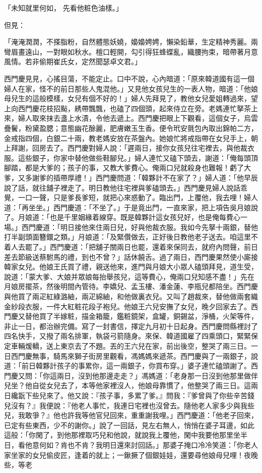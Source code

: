 \begin{showcontents}{}
「未知就里何如，  先看他粧色油樣。」

但見：

「淹淹潤潤，不搽脂粉，自然體態妖嬈，嬝嬝娉娉，懶染鉛華，生定精神秀麗。兩彎眉畫遠山，一對眼如秋水。檀口輕開，勾引得狂蜂蝶亂，織腰拘束，暗帶著月意風情。若非偷期崔氏女，定然聞瑟卓文君。」

西門慶見見，心搖目蕩，不能定止。口中不說，心內暗道：「原來韓道國有這一個婦人在家，怪不的前日那些人鬼混他。」又見他女孩兒生的一表人物，暗道：「他娘母兒生的這般模樣，女兒有個不好的！」婦人先拜見了，教他女兒愛姐轉過來，望上向西門慶花枝招颭，綉帶飄飄，也磕了四個頭，起來侍立在旁。老媽連忙拏茶上來，婦人取來抹去盞上水漬，令他去遞上。西門慶把眼上下觀看，這個女子，烏雲疊鬢，粉黛盈腮；意態幽花酴麗，肥膚嫩玉生香。便令玳安氈包內取出錦帕二方，金戒指四個，白銀二十兩，教老媽安放在茶盤內。她娘忙將戒指帶在女兒手上，朝上拜謝，回房去了。西門慶對婦人說：「遲兩日，接你女孩兒往宅裡去，與他裁衣服。這些銀子，你家中替他做些鞋腳兒。」婦人連忙又磕下頭去，謝道：「俺每頭頂腳踏，都是大爹的；孩子的事，又教大爹費心。俺兩口兒就殺身也難報！虧了大爹，又多謝爹的插帶厚禮！」西門慶問道：「韓夥計不在家了？」婦人道：「他早辰說了話，就往舖子裡走了。明日教他往宅裡與爹磕頭去。」西門慶見婦人說話乖覺，一口一聲，只是爹長爹短，就把心來惑動了。臨出門，上覆他，我去哩！婦人道：「再坐坐。」西門慶道：「不坐了。」于是竟出門，一直來家，把上項告吳月娘說了。月娘道：「也是千里姻緣着線穿。既是韓夥計這女孩兒好，也是俺每費心一場。」西門慶道：「明日接他來住兩日兒，好與他裁衣服。我如今先拏十兩銀，替他打半副頭面簪鐶之類。」月娘道：「及緊儹做去，正好後日教他老子送去。咱這里不着人去罷了。」西門慶道：「把舖子關兩日也罷，還着來保同去，就府內問聲，前日差去節級送蔡駙馬的禮，到也不曾？」話休饒舌。過了兩日，西門慶果然使小廝接韓家女兒。他娘王氏買了禮，親送他來，進門與月娘大小眾人磕頭拜見，道生受，說道：「蒙大爹、大娘并眾娘每抬舉孩兒，這等費心，俺兩口兒知感不盡！」先在月娘房擺茶，然後明間內管待。李嬌兒、孟玉樓、潘金蓮、李瓶兒都陪坐。西門慶與他買了兩疋紅綠潞紬，兩疋綿紬，和他做裏衣兒。又叫了趙裁來，替他做兩套織金紗段衣服，一件大紅粧花段子袍兒。他娘王六兒安撫了女兒，晚夕回家去了。西門慶又替他買了半嫁粧，描金箱籠，鑑粧鏡架，盒罐，銅錫盆，淨桶，火架等件，非止一日，都治辦完備。寫了一封書信，擇定九月初十日起身。西門慶問縣裡討了四名快手，又撥了兩名排軍，執袋弓箭隨身。來保、韓道國雇了四乘頭口，緊緊保定車輛煖轎，送上東京去了不題。丟的王六兒在家，前出後空，整哭了兩三日。一日西門慶無事，騎馬來獅子街房里觀看，馮媽媽來遞茶。西門慶與了一兩銀子，說道：「前日韓夥計孩子的事累你，這一兩銀子，你買布穿。」婆子連忙磕頭謝了。西門慶又問：「你這兩日，沒到他那邊走走？」馮媽道：「老身那一日沒到他那里做伴兒坐？他自從女兒去了，本等他家裡沒人，他娘母靠慣了，他整哭了兩三日。這兩日纔翫下些兒來了。他又說：『孩子事，多累了爹。』問我：『爹曾與了你些辛苦錢兒沒有？』我便說：『他老人事忙，我連日宅裡也沒曾去。隨他老人家多少與我些兒，我敢爭？』他也許我等他官兒回來，重重謝我哩。」西門慶道：「他老子回來，已定有些東西，少不的謝你。」說了一回話，見左右無人，悄悄在婆子耳邊，如此這般：「你閑了，到他那裡取巧兒和他說，就說我上覆他，閑中我要他那里坐半日，看他意何如？肯也不肯？我明日還來討回話。」那婆子掩口冷冷笑道：「你老人家坐家的女兒偷皮匠，逢着的就上；一鍬撅了個銀娃娃，還要尋他娘母兒哩！夜晚些，等老
\end{showcontents}
